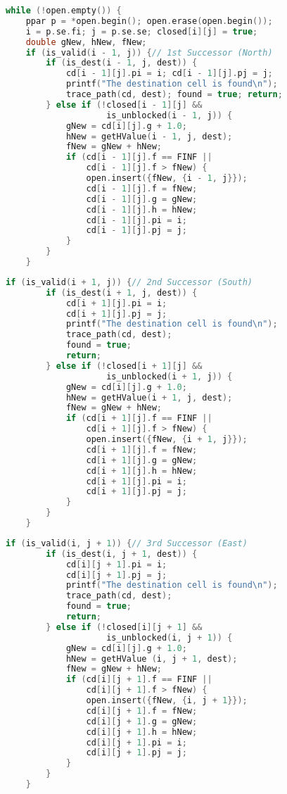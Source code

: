 \newpage

\begin{lstlisting}[language=C++, title=Parte 2: A* (Parte II)]
while (!open.empty()) {
	ppar p = *open.begin(); open.erase(open.begin());
	i = p.se.fi; j = p.se.se; closed[i][j] = true;
	double gNew, hNew, fNew;
	if (is_valid(i - 1, j)) {// 1st Successor (North)
		if (is_dest(i - 1, j, dest)) {
			cd[i - 1][j].pi = i; cd[i - 1][j].pj = j;
			printf("The destination cell is found\n");
			trace_path(cd, dest); found = true; return;
		} else if (!closed[i - 1][j] && 
		            is_unblocked(i - 1, j)) {
			gNew = cd[i][j].g + 1.0;
			hNew = getHValue(i - 1, j, dest);
			fNew = gNew + hNew;
			if (cd[i - 1][j].f == FINF || 
			    cd[i - 1][j].f > fNew) {
				open.insert({fNew, {i - 1, j}});
				cd[i - 1][j].f = fNew;
				cd[i - 1][j].g = gNew;
				cd[i - 1][j].h = hNew;
				cd[i - 1][j].pi = i;
				cd[i - 1][j].pj = j;
			}
		}
	}
\end{lstlisting}

\newpage

\begin{lstlisting}[language=C++, title=Parte 2: A* (Parte III)]
	if (is_valid(i + 1, j)) {// 2nd Successor (South)
		if (is_dest(i + 1, j, dest)) {
			cd[i + 1][j].pi = i;
			cd[i + 1][j].pj = j;
			printf("The destination cell is found\n");
			trace_path(cd, dest);
			found = true;
			return;
		} else if (!closed[i + 1][j] && 
		            is_unblocked(i + 1, j)) {
			gNew = cd[i][j].g + 1.0;
			hNew = getHValue(i + 1, j, dest);
			fNew = gNew + hNew;
			if (cd[i + 1][j].f == FINF || 
			    cd[i + 1][j].f > fNew) {
				open.insert({fNew, {i + 1, j}});
				cd[i + 1][j].f = fNew;
				cd[i + 1][j].g = gNew;
				cd[i + 1][j].h = hNew;
				cd[i + 1][j].pi = i;
				cd[i + 1][j].pj = j;
			}
		}
	}
\end{lstlisting}

\newpage

\begin{lstlisting}[language=C++, title=Parte 2: A* (Parte IV)]
	if (is_valid(i, j + 1)) {// 3rd Successor (East)
		if (is_dest(i, j + 1, dest)) {
			cd[i][j + 1].pi = i;
			cd[i][j + 1].pj = j;
			printf("The destination cell is found\n");
			trace_path(cd, dest);
			found = true;
			return;
		} else if (!closed[i][j + 1] && 
		            is_unblocked(i, j + 1)) {
			gNew = cd[i][j].g + 1.0;
			hNew = getHValue (i, j + 1, dest);
			fNew = gNew + hNew;
			if (cd[i][j + 1].f == FINF || 
			    cd[i][j + 1].f > fNew) {
				open.insert({fNew, {i, j + 1}});
				cd[i][j + 1].f = fNew;
				cd[i][j + 1].g = gNew;
				cd[i][j + 1].h = hNew;
				cd[i][j + 1].pi = i;
				cd[i][j + 1].pj = j;
			}
		}
	}
\end{lstlisting}

